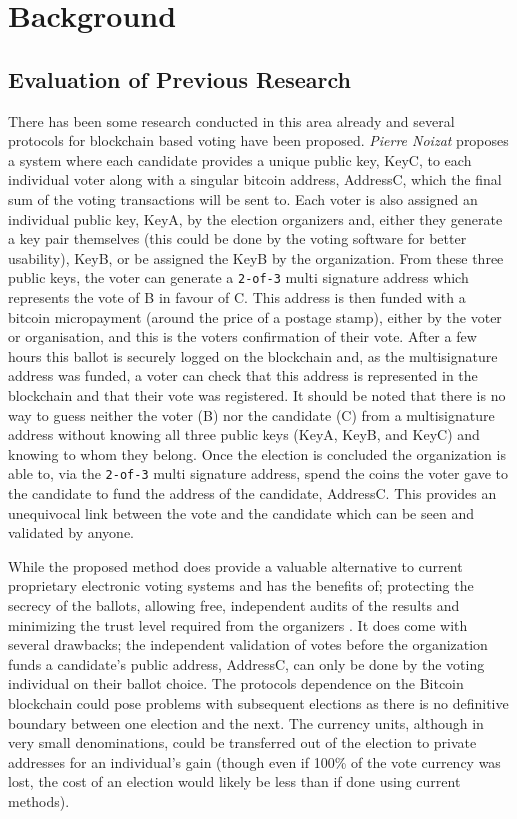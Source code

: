 \documentclass{article}
\begin{document}
    \section{Background}
    \subsection{Evaluation of Previous Research}

There has been some research conducted in this area already and several protocols for blockchain based voting have been proposed. \textit{Pierre Noizat} proposes a system \citep{3_noizat_2016} where each candidate provides a unique public key, KeyC, to each individual voter along with a singular bitcoin address, AddressC, which the final sum of the voting transactions will be sent to. Each voter is also assigned an individual public key, KeyA, by the election organizers and, either they generate a key pair themselves (this could be done by the voting software for better usability), KeyB, or be assigned the KeyB by the organization. From these three public keys, the voter can generate a \verb|2-of-3| multi signature address which represents the vote of B in favour of C. This address is then funded with a bitcoin micropayment (around the price of a postage stamp), either by the voter or organisation, and this is the voters confirmation of their vote. After a few hours this ballot is securely logged on the blockchain and, as the multisignature address was funded, a voter can check that this address is represented in the blockchain and that their vote was registered. It should be noted that there is no way to guess neither the voter (B) nor the candidate (C) from a multisignature address without knowing all three public keys (KeyA, KeyB, and KeyC) and knowing to whom they belong. Once the election is concluded the organization is able to, via the \verb|2-of-3| multi signature address, spend the coins the voter gave to the candidate to fund the address of the candidate, AddressC. This provides an unequivocal link between the vote and the candidate which can be seen and validated by anyone.

While the proposed method does provide a valuable alternative to current proprietary electronic voting systems and has the benefits of; protecting the secrecy of the ballots, allowing free, independent audits of the results and minimizing the trust level required from the organizers \citep{3_noizat_2016}. It does come with several drawbacks; the independent validation of votes before the organization funds a candidate's public address, AddressC, can only be done by the voting individual on their ballot choice. The protocols dependence on the Bitcoin blockchain could pose problems with subsequent elections as there is no definitive boundary between one election and the next. The currency units, although in very small denominations, could be transferred out of the election to private addresses for an individual's gain (though even if 100\% of the vote currency was lost, the cost of an election would likely be less than if done using current methods).
\end{document}
